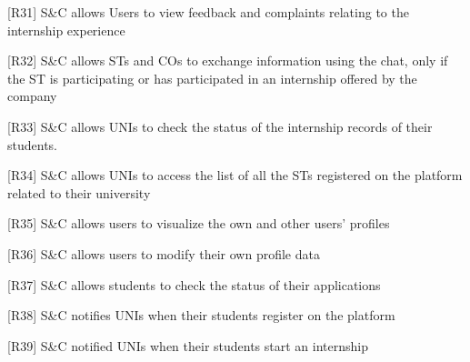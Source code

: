 [R31] S\&C allows Users to view feedback and complaints relating to the internship experience

[R32] S\&C allows STs and COs to exchange information using the chat, only if the ST is participating or has participated in an internship offered by the company

[R33] S\&C allows UNIs to check the status of the internship records of their students.

[R34] S\&C allows UNIs to access the list of all the STs registered on the platform related to their university

[R35] S\&C allows users to visualize the own and other users' profiles

[R36] S\&C allows users to modify their own profile data

[R37] S\&C allows students to check the status of their applications

[R38] S\&C notifies UNIs when their students register on the platform

[R39] S\&C notified UNIs when their students start an internship

